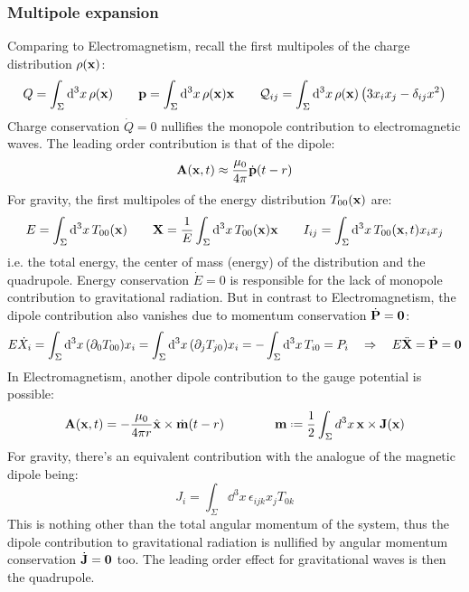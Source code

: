 \subsubsection{Multipole expansion}

Comparing to Electromagnetism, recall the first multipoles of the charge distribution $ \rho(\mathbf{x}) $:
\begin{equation*}
  Q = \int_\Sigma \mathrm{d}^3 x\, \rho(\mathbf{x})
  \qquad
  \mathbf{p} = \int_\Sigma \mathrm{d}^3 x\, \rho(\mathbf{x}) \mathbf{x}
  \qquad
  \mathcal{Q}_{ij} = \int_\Sigma \mathrm{d}^3 x\, \rho(\mathbf{x}) \left( 3 x_i x_j - \delta_{ij} x^2 \right)
\end{equation*}
Charge conservation $ \dot{Q} = 0 $ nullifies the monopole contribution to electromagnetic waves. The leading order contribution is that of the dipole:
\begin{equation*}
  \mathbf{A}(\mathbf{x},t) \approx \frac{\mu_0}{4\pi} \dot{\mathbf{p}}(t - r)
\end{equation*}
For gravity, the first multipoles of the energy distribution $ T_{00}(\mathbf{x}) $ are:
\begin{equation*}
  E = \int_\Sigma \mathrm{d}^3 x\, T_{00}(\mathbf{x})
  \qquad
  \mathbf{X} = \frac{1}{E} \int_\Sigma \mathrm{d}^3 x\, T_{00}(\mathbf{x}) \mathbf{x}
  \qquad
  I_{ij} = \int_\Sigma \mathrm{d}^3 x\, T_{00}(\mathbf{x},t) x_i x_j
\end{equation*}
i.e. the total energy, the center of mass (energy) of the distribution and the quadrupole. Energy conservation $ \dot{E} = 0 $ is responsible for the lack of monopole contribution to gravitational radiation. But in contrast to Electromagnetism, the dipole contribution also vanishes due to momentum conservation $ \dot{\mathbf{P}} = \mathbf{0} $:
\begin{equation*}
  E \dot{X}_i = \int_\Sigma \mathrm{d}^3 x\, (\partial_0 T_{00}) x_i = \int_\Sigma \mathrm{d}^3 x\, (\partial_j T_{j0}) x_i = - \int_\Sigma \mathrm{d}^3 x\, T_{i0} = P_i
  \quad \Rightarrow \quad
  E \ddot{\mathbf{X}} = \dot{\mathbf{P}} = \mathbf{0}
\end{equation*}
In Electromagnetism, another dipole contribution to the gauge potential is possible:
\begin{equation*}
  \ve{A}(\ve{x},t) = -\frac{\mu_0}{4\pi r} \hat{\ve{x}} \times \dot{\ve{m}}(t - r)
  \qquad \qquad
  \ve{m} \defeq \frac{1}{2} \int_\Sigma d^3 x\, \ve{x} \times \ve{J}(\ve{x})
\end{equation*}
For gravity, there's an equivalent contribution with the analogue of the magnetic dipole being:
\begin{equation*}
  J_i = \int_\Sigma \dd^3 x\, \epsilon_{ijk} x_j T_{0k}
\end{equation*}
This is nothing other than the total angular momentum of the system, thus the dipole contribution to gravitational radiation is nullified by angular momentum conservation $ \dot{\mathbf{J}} = \mathbf{0} $ too. The leading order effect for gravitational waves is then the quadrupole.

